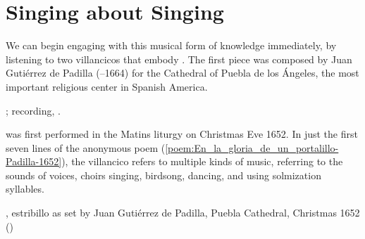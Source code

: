 \section{Singing about Singing}

We can begin engaging with this musical form of knowledge immediately, by
listening to two villancicos that embody .%
    \Autocites
    {Murata:Singing}
The first piece was composed by Juan Gutiérrez de Padilla (--1664)
for the Cathedral of Puebla de los Ángeles, the most important religious center
in Spanish America.%
\begin{Footnote}
    ; 
    recording, \autocite{Padilla:1652ChristmasCD}.
\end{Footnote}
 was first performed in the Matins liturgy
on Christmas Eve 1652.  
In just the first seven lines of the anonymous poem
(\cref{poem:En_la_gloria_de_un_portalillo-Padilla-1652}), the villancico refers
to multiple kinds of music, referring to the sounds of voices, choirs singing,
birdsong, dancing, and using solmization syllables.

{, estribillo as set by Juan Gutiérrez
de Padilla, Puebla Cathedral, Christmas 1652 
()}

